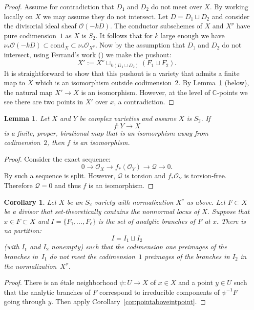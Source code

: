 \documentclass[JEP,XML,SOM,Unicode,NoFloatCountersInSection,published]{cedram}
\theoremstyle{plain}
\newtheorem{corollary}[theorem]{Corollary}
\newtheorem{lemma}[theorem]{Lemma}
\theoremstyle{definition}
\newcommand\CC{{\mathbb C}}
\newcommand\Oc{{\mathcal O}}
\newcommand\Qc{{\mathcal Q}}
\newcommand\cond{{\mathrm{cond}}}
\newcommand\cl{{\colon}}
\begin{document}
\begin{proof}
Assume for contradiction that $D_1$ and $D_2$ do not meet over $X$. By working locally on $X$ we may assume they do not intersect. Let $D=D_1\sqcup D_2$ and consider the divisorial ideal sheaf $\Oc(-k D)$. The conductor subschemes of $X$ and $X^\nu$ have pure codimension~$1$ as $X$ is $S_2$. It follows that for $k$ large enough we have $\nu_*\Oc(-kD)\subset \cond_X\subset \nu_*\Oc_{X^\nu}$. Now by the assumption that $D_1$ and $D_2$ do not intersect, using Ferrand's work (\cite[Th.\,7.1]{Ferrand}) we make the pushout:
\[
X':=X^\nu \sqcup_{k(D_1\sqcup D_2)} (F_1\sqcup F_2).
\]
It is straightforward to show that this pushout is a variety that admits a finite map to $X$ which is an isomorphism outside codimension~$2$. By Lemma~\ref{lem:isoincodim2} (below), the natural map $X'\to X$ is an isomorphism. However, at the level of $\CC$-points we see there are two points in $X'$ over $x$, a contradiction.
\end{proof}

\begin{lemma}\label{lem:isoincodim2}
Let $X$ and $Y$ be complex varieties and assume $X$ is $S_2$. If
\[
f\cl Y\to X
\]
is a finite, proper, birational map that is an isomorphism away from codimension~$2$, then $f$ is an isomorphism.
\end{lemma}

\begin{proof}%
Consider the exact sequence:
\[
0\to \Oc_X\to f_*(\Oc_Y) \to \Qc \to 0.
\]
By \cite[Lem.\,10.6]{KollarModuliBook} such a sequence is split. However, $\Qc$ is torsion and $f_*\Oc_Y$ is torsion-free. Therefore $\Qc=0$ and thus $f$ is an isomorphism.
\end{proof}

\begin{corollary}\label{cor:branchesmustmeetinnorm}
Let $X$ be an $S_2$ variety with normalization $X^\nu$ as above. Let $F\subset X$ be a divisor that set-theoretically contains the nonnormal locus of $X$. Suppose that $x\in F\subset X$ and $I=\{F_1,\dots,F_\ell\}$ is the set of analytic branches of $F$ at $x$. There is no partition:
\[
I = I_1\sqcup I_2
\]
(with $I_1$ and $I_2$ nonempty) such that the codimension one preimages of the branches in~$I_1$ do not meet the codimension~$1$ preimages of the branches in $I_2$ in the normalization~$X^\nu$.
\end{corollary}

\begin{proof}
There is an étale neighborhood $\psi\cl U\to X$ of $x\in X$ and a point $y\in U$ such that the analytic branches of $F$ correspond to irreducible components of $\psi^{-1}F$ going through $y$. Then apply Corollary~\ref{cor:pointaboveintpoint}.
\end{proof}
\end{document}
